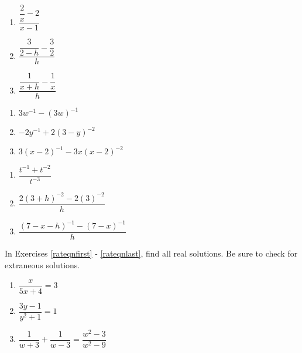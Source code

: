 \begin{multicols}{3}
\begin{enumerate}
\setcounter{enumi}{\value{HW}}

\item $\dfrac{\dfrac{2}{x} - 2}{x-1}$
\item $\dfrac{\dfrac{3}{2-h} - \dfrac{3}{2}}{h}$
\item $\dfrac{\dfrac{1}{x+h} - \dfrac{1}{x}}{h}$

\setcounter{HW}{\value{enumi}}
\end{enumerate}
\end{multicols}


\begin{multicols}{3}
\begin{enumerate}
\setcounter{enumi}{\value{HW}}

\item  $3w^{-1} - (3w)^{-1}$
\item  $-2y^{-1}  + 2(3-y)^{-2}$
\item  $3(x-2)^{-1} - 3x(x-2)^{-2}$

 
\setcounter{HW}{\value{enumi}}
\end{enumerate}
\end{multicols}

\begin{multicols}{3}
\begin{enumerate}
\setcounter{enumi}{\value{HW}}

\item $\dfrac{t^{-1} + t^{-2}}{t^{-3}}$  
\item $\dfrac{2(3+h)^{-2} - 2(3)^{-2}}{h}$ 
\item $\dfrac{(7-x-h)^{-1} - (7-x)^{-1}}{h}$  \label{ratsimplast}


\setcounter{HW}{\value{enumi}}
\end{enumerate}
\end{multicols}

\vspace{-0.15in}

In Exercises \ref{rateqnfirst} - \ref{rateqnlast}, find all real solutions.  Be sure to check for extraneous solutions.

\begin{multicols}{3}
\begin{enumerate}
\setcounter{enumi}{\value{HW}}

\item $\dfrac{x}{5x + 4} = 3$ \label{rateqnfirst}
\item $\dfrac{3y - 1}{y^{2} + 1} = 1$
\item $\dfrac{1}{w + 3} + \dfrac{1}{w - 3} = \dfrac{w^{2} - 3}{w^{2} - 9}$

\setcounter{HW}{\value{enumi}}
\end{enumerate}
\end{multicols}

